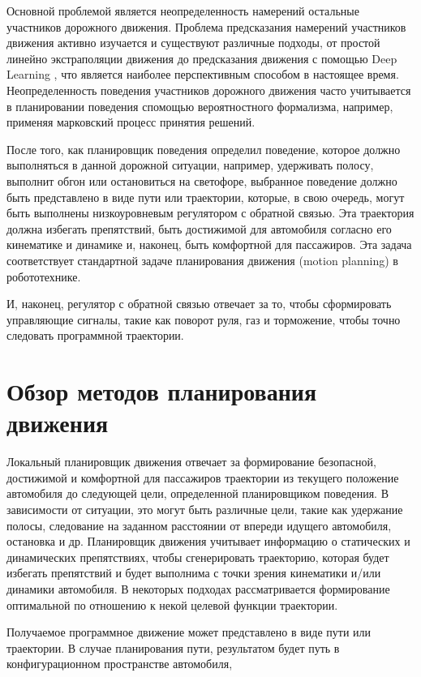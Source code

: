 Основной проблемой является неопределенность намерений остальные участников дорожного движения. Проблема предсказания
намерений участников движения активно изучается и существуют различные подходы, от простой линейно экстраполяции
\cite{darpa_junior_frenet} движения до предсказания движения с помощью Deep Learning \cite{nn_motion_prediction},
что является наиболее перспективным способом в настоящее время. Неопределенность поведения участников дорожного движения
часто учитывается в планировании поведения спомощью вероятностного формализма, например, применяя марковский процесс
принятия решений.

После того, как планировщик поведения определил поведение, которое должно выполняться в данной дорожной ситуации,
например, удерживать полосу, выполнит обгон или остановиться на светофоре, выбранное поведение должно быть
представлено в виде пути или траектории, которые, в свою очередь, могут быть выполнены низкоуровневым регулятором с
обратной связью. Эта траектория должна избегать препятствий, быть достижимой для автомобиля согласно его кинематике
и динамике и, наконец, быть комфортной для пассажиров. Эта задача соответствует стандартной задаче планирования
движения (motion planning) в робототехнике.

И, наконец, регулятор с обратной связью отвечает за то, чтобы сформировать управляющие сигналы, такие как поворот
руля, газ и торможение, чтобы точно следовать программной траектории.

\section{Обзор методов планирования движения}

Локальный планировщик движения отвечает за формирование безопасной, достижимой и комфортной для пассажиров траектории
из текущего положение автомобиля до следующей цели, определенной планировщиком поведения. В зависимости от ситуации,
это могут быть различные цели, такие как удержание полосы, следование на заданном расстоянии от впереди идущего
автомобиля, остановка и др. Планировщик движения учитывает информацию о статических и динамических препятствиях, чтобы
сгенерировать траекторию, которая будет избегать препятствий и будет выполнима с точки зрения кинематики и/или динамики
автомобиля. В некоторых подходах рассматривается формирование оптимальной по отношению к некой целевой функции
траектории.

Получаемое программное движение может представлено в виде пути или траектории. В случае планирования пути, результатом
будет путь в конфигурационном пространстве автомобиля,


